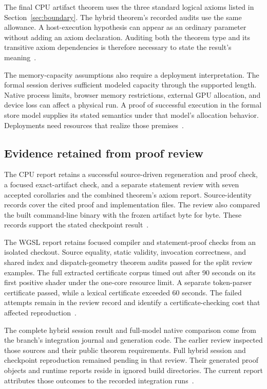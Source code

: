 The final CPU artifact theorem uses the three standard logical axioms listed in Section~\ref{sec:boundary}.  The hybrid theorem's recorded audits use the same allowance.  A host-execution hypothesis can appear as an ordinary parameter without adding an axiom declaration.  Auditing both the theorem type and its transitive axiom dependencies is therefore necessary to state the result's meaning~\cite{review,wg-composition,wg-backend}.

The memory-capacity assumptions also require a deployment interpretation.  The formal session derives sufficient modeled capacity through the supported length.  Native process limits, browser memory restrictions, external GPU allocation, and device loss can affect a physical run.  A proof of successful execution in the formal store model supplies its stated semantics under that model's allocation behavior.  Deployments need resources that realize those premises~\cite{budget,wg-host}.

\subsection{Evidence retained from proof review}

The CPU report retains a successful source-driven regeneration and proof check, a focused exact-artifact check, and a separate statement review with seven accepted corollaries and the combined theorem's axiom report.  Source-identity records cover the cited proof and implementation files.  The review also compared the built command-line binary with the frozen artifact byte for byte.  These records support the stated checkpoint result~\cite{cpu-report-evidence}.

The WGSL report retains focused compiler and statement-proof checks from an isolated checkout.  Source equality, static validity, invocation correctness, and shared index and dispatch-geometry theorem audits passed for the split review examples.  The full extracted certificate corpus timed out after 90 seconds on its first positive shader under the one-core resource limit.  A separate token-parser certificate passed, while a lexical certificate exceeded 60 seconds.  The failed attempts remain in the review record and identify a certificate-checking cost that affected reproduction~\cite{wg-review}.

The complete hybrid session result and full-model native comparison come from the branch's integration journal and generation code.  The earlier review inspected those sources and their public theorem requirements.  Full hybrid session and checkpoint reproduction remained pending in that review.  Their generated proof objects and runtime reports reside in ignored build directories.  The current report attributes those outcomes to the recorded integration runs~\cite{wg-journal,wg-review}.

